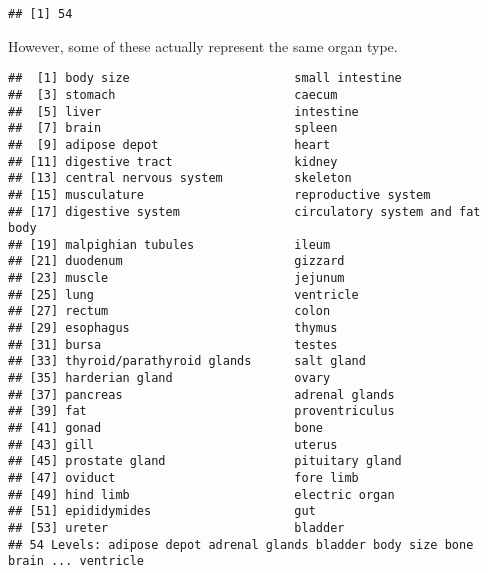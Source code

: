 \documentclass[
]{article}
\newenvironment{Shaded}{\begin{snugshade}}{\end{snugshade}}
\newcommand{\CommentTok}[1]{\textcolor[rgb]{0.56,0.35,0.01}{\textit{#1}}}
\newcommand{\FunctionTok}[1]{\textcolor[rgb]{0.13,0.29,0.53}{\textbf{#1}}}
\newcommand{\NormalTok}[1]{#1}
\newcommand{\SpecialCharTok}[1]{\textcolor[rgb]{0.81,0.36,0.00}{\textbf{#1}}}
\begin{document}
\begin{Shaded}
\end{Shaded}

\begin{verbatim}
## [1] 54
\end{verbatim}

However, some of these actually represent the same organ type.

\begin{Shaded}
\end{Shaded}

\begin{verbatim}
##  [1] body size                       small intestine                
##  [3] stomach                         caecum                         
##  [5] liver                           intestine                      
##  [7] brain                           spleen                         
##  [9] adipose depot                   heart                          
## [11] digestive tract                 kidney                         
## [13] central nervous system          skeleton                       
## [15] musculature                     reproductive system            
## [17] digestive system                circulatory system and fat body
## [19] malpighian tubules              ileum                          
## [21] duodenum                        gizzard                        
## [23] muscle                          jejunum                        
## [25] lung                            ventricle                      
## [27] rectum                          colon                          
## [29] esophagus                       thymus                         
## [31] bursa                           testes                         
## [33] thyroid/parathyroid glands      salt gland                     
## [35] harderian gland                 ovary                          
## [37] pancreas                        adrenal glands                 
## [39] fat                             proventriculus                 
## [41] gonad                           bone                           
## [43] gill                            uterus                         
## [45] prostate gland                  pituitary gland                
## [47] oviduct                         fore limb                      
## [49] hind limb                       electric organ                 
## [51] epididymides                    gut                            
## [53] ureter                          bladder                        
## 54 Levels: adipose depot adrenal glands bladder body size bone brain ... ventricle
\end{verbatim}
\end{document}
